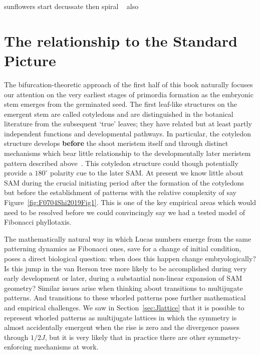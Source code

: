 sunflowers start decussate then spiral ~\cite{priestleyVascularAnatomyHelianthus1936}
also~\cite{codaccioniEtudePhyllotaxiqueLot1955}

\section{The relationship to the Standard Picture}
\label{sec:jugacy}
The bifurcation-theoretic approach of the first half of this book naturally focuses our attention on the very earliest stages of primordia formation as the embryonic stem emerges from the germinated seed.  The first leaf-like structures on the emergent stem are called cotyledons and are distinguished in the botanical literature from the subsequent `true' leaves; they have related but at least partly independent functions and developmental pathways. In particular, the cotyledon structure develops \textbf{before} the shoot meristem itself and through distinct mechanisms which bear little relationship to the developmentally later meristem pattern described above~\autocite{yoshidaGeneticControlPlant2014}. This cotyledon structure could though potentially provide a $180^\circ$ polarity cue to the later SAM. At present we know  little about SAM during the crucial initiating period after the formation of the cotyledons but before the establishment of patterns with the relative complexity of say Figure~\ref{fig:F0704Shi2019Fig1}. This is one of the key empirical areas which would need to be resolved before we could convincingly say we had a tested model of Fibonacci phyllotaxis. 

The mathematically natural way in which Lucas numbers emerge from the same patterning dynamics as Fibonacci ones, save for a change of initial condition, poses a direct biological question: when does this happen change embryologically?  Is this jump in the van Iterson tree more likely to be accomplished during very early development or later, during a substantial non-linear expansion of SAM geometry? Similar issues arise when thinking about transitions to multijugate patterns. And transitions to these whorled patterns pose further mathematical and empirical challenges. We saw in Section~\ref{sec:Jlattice} that it is possible to represent whorled patterns as multijugate lattices in which the symmetry is almost accidentally emergent when the  rise is zero and the divergence passes through $1/2J$, but it is very likely that in practice there are other symmetry-enforcing mechanisms at work. 



